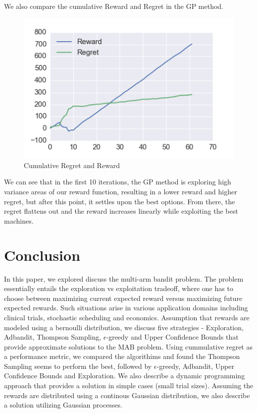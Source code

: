 \documentclass{article}
\begin{document}
We also compare the cumulative Reward and Regret in the GP method.

\begin{figure}[H]
\centering
\includegraphics[scale=0.8]{reward_regret.png}
\caption{Cumulative Regret and Reward}
\end{figure}

We can see that in the first 10 iterations, the GP method is exploring high variance areas of our reward function, resulting in a lower reward and higher regret, but after this point, it settles upon the best options. From there, the regret flattens out and the reward increases linearly while exploiting the best machines.

\section{Conclusion}

In this paper, we explored discuss the multi-arm bandit problem. The problem essentially entails the exploration vs exploitation tradeoff, where one has to choose between maximizing current expected reward versus maximizing future expected rewards. Such situations arise in various application domains including clinical trials, stochastic scheduling and economics. Assumption that rewards are modeled using a bernoulli distribution, we discuss five strategies -  Exploration, Adbandit, Thompson Sampling, $\epsilon$-greedy and Upper Confidence Bounds that provide approximate solutions to the MAB problem. Using cummulative regret as a performance metric, we compared the algorithims and found the Thompson Sampling seems to perform the best, followed by $\epsilon$-greedy, Adbandit, Upper Confidence Bounds and  Exploration. We also describe a dynamic programming approach that provides a solution in simple cases \big(small trial sizes\big). Assuming the rewards are distributed using a continous Gaussian distribution, we also describe a solution utilizing Gaussian processes. 
\end{document}
